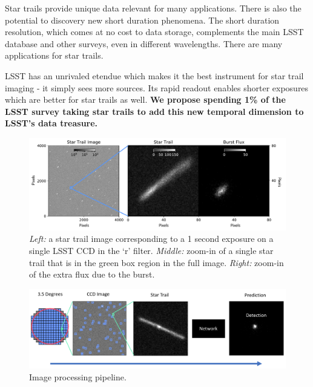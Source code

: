 \documentclass[12pt, letterpaper]{article}
\begin{document}
Star trails provide unique data relevant for many applications. There is also the potential to discovery new short duration phenomena. The short duration resolution, which comes at no cost to data storage, complements the main LSST database and other surveys, even in different wavelengths. There are many applications for star trails. 

LSST has an unrivaled etendue which makes it the best instrument for star trail imaging - it simply sees more sources. Its rapid readout enables shorter exposures which are better for star trails as well. \textbf{We propose spending 1\% of the LSST survey taking star trails to add this new temporal dimension to LSST's data treasure.}

\begin{figure}[htb]
\center
\includegraphics[width=1.00\columnwidth]{star_trail.pdf}
\caption{\textit{Left:} a star trail image corresponding to a 1 second exposure on a single LSST CCD in the `r' filter. \textit{Middle:} zoom-in of a single star trail that is in the green box region in the full image. \textit{Right:} zoom-in of the extra flux due to the burst.}
\label{fig:trail}
\end{figure}

\begin{figure}[htb!]
\center
\includegraphics[width=\columnwidth]{imageprocessing.png}
\caption{Image processing pipeline.}
\label{fig:pipeline}
\end{figure}
\end{document}
